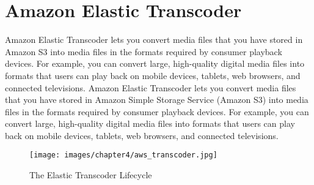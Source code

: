 \section{Amazon Elastic Transcoder}
\label{sec:Amazon Elastic Transcoder}

  Amazon Elastic Transcoder lets you convert media files that you have stored in Amazon S3 into media files in the formats required by consumer playback devices. For example, you can convert large, high-quality digital media files into formats that users can play back on mobile devices, tablets, web browsers, and connected televisions.
Amazon Elastic Transcoder lets you convert media files that you have stored in Amazon Simple Storage Service (Amazon S3) into media files in the formats required by consumer playback devices. For example, you can convert large, high-quality digital media files into formats that users can play back on mobile devices, tablets, web browsers, and connected televisions.

\begin{figure}[htb] %
 \centering
 \texttt{[image: images/chapter4/aws\_transcoder.jpg]}\hfill
 \caption[The Elastic Transcoder Lifecycle]{The Elastic Transcoder Lifecycle}
 \label{fig:fourV}
\end{figure}

